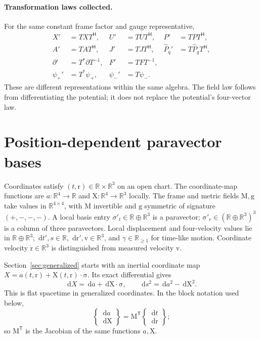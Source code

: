 \documentclass[11pt]{article}
\newcommand{\pv}[1]{{#1}}
\newcommand{\pvGreek}[1]{{#1}}
\newcommand{\vstyle}[1]{{\bm{\mathrm{#1}}}}
\newcommand{\pA}{\pv{A}}
\newcommand{\pF}{\pv{F}}
\newcommand{\pSigmaTPrime}{\pvsigma'_t}
\newcommand{\bsigRPrime}{\bsig'_r}
\newcommand{\pJ}{\pv{J}}
\newcommand{\pP}{\pv{P}}
\newcommand{\pT}{\pv{T}}
\newcommand{\pU}{\pv{U}}
\newcommand{\pX}{\pv{X}}
\newcommand{\pvpartial}{\pvGreek{\partial}}
\newcommand{\pvpsi}{\pvGreek{\psi}}
\newcommand{\pvsigma}{\pvGreek{\sigma}}
\numberwithin{equation}{section}
\newcommand{\R}{\mathbb{R}}
\newcommand{\dotprod}{\cdot}
\newcommand{\bsig}{\vstyle{\sigma}}
\newcommand{\bX}{\vstyle{X}}
\newcommand{\br}{\vstyle{r}}
\newcommand{\bv}{\vstyle{v}}
\newcommand{\bg}{\vstyle{g}}
\newcommand{\bM}{\vstyle{M}}
\newcommand{\hP}{{\hat{\pP}}}
\newcommand{\hPq}{\hP_q}
\newcommand{\dd}{\,\mathrm d}
\begin{document}
\paragraph{Transformation laws collected.}
For the same constant frame factor and gauge representative,
\[
 \boxed{\begin{aligned}
 \pX'&=\pT\pX\pT^{\mathsf H},
 &\pU'&=\pT\pU\pT^{\mathsf H},
 &\pP'&=\pT\pP\pT^{\mathsf H},\\
 \pA'&=\pT\pA\pT^{\mathsf H},
 &\pJ'&=\pT\pJ\pT^{\mathsf H},
 &\hPq'&=\pT\hPq\pT^{\mathsf H},\\
 \pvpartial'&=\pT^*\pvpartial\pT^{-1},
 &\pF'&=\pT\pF\pT^{-1},\\
 \pvpsi_+'&=\pT^*\pvpsi_+,
 &\pvpsi_-'&=\pT\pvpsi_-.
 \end{aligned}}
\]
These are different representations within the same algebra. The field law
follows from differentiating the potential; it does not replace the
potential's four-vector law.

\section{Position-dependent paravector bases}
\label{sec:variable-bases}

Coordinates satisfy $(t,\br)\in\R\times\R^3$ on an open chart.
The coordinate-map functions are $a:\R^4\to\R$ and
$\bX:\R^4\to\R^3$ locally. The frame and metric fields
$\bM,\bg$ take values in $\R^{4\times4}$, with $\bM$ invertible
and $\bg$ symmetric of signature $(+,-,-,-)$.
A local basis entry $\pSigmaTPrime\in\R\oplus\R^3$ is a paravector;
$\bsigRPrime\in(\R\oplus\R^3)^3$ is a column of three paravectors.
Local displacement and four-velocity values lie in $\R\oplus\R^3$;
$\dd t',s\in\R$, $\dd\br',\bv\in\R^3$, and $\gamma\in\R_{\ge1}$
for time-like motion. Coordinate velocity $\dot\br\in\R^3$ is distinguished
from measured velocity $\bv$.

Section~\ref{sec:generalized} starts with an inertial coordinate map
$\pX=a(t,\br)+\bX(t,\br)\dotprod\bsig$. Its exact differential gives
\[
 \dd\pX=\dd a+\dd\bX\dotprod\bsig,\qquad
 \dd s^2=\dd a^2-\dd\bX^2.
\]
This is flat spacetime in generalized coordinates. In the block notation
used below,
\[
 \begin{Bmatrix}\dd a\\\dd\bX\end{Bmatrix}
 =\bM^{\mathsf T}\begin{Bmatrix}\dd t\\\dd\br\end{Bmatrix};
\]
so $\bM^{\mathsf T}$ is the Jacobian of the same functions $a,\bX$.
\end{document}
